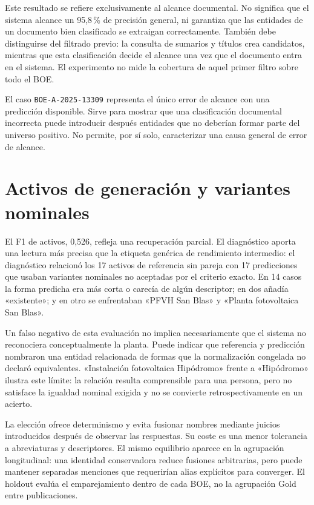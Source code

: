 Este resultado se refiere exclusivamente al alcance documental. No significa
que el sistema alcance un 95,8\,\% de precisión general, ni garantiza que las
entidades de un documento bien clasificado se extraigan correctamente. También
debe distinguirse del filtrado previo: la consulta de sumarios y títulos crea
candidatos, mientras que esta clasificación decide el alcance una vez que el
documento entra en el sistema. El experimento no mide la cobertura de aquel
primer filtro sobre todo el BOE.

El caso \texttt{BOE-A-2025-13309} representa el único error de alcance con una
predicción disponible. Sirve para mostrar que una clasificación documental
incorrecta puede introducir después entidades que no deberían formar parte
del universo positivo. No permite, por sí solo, caracterizar una causa general
de error de alcance.

\section{Activos de generación y variantes nominales}
El F1 de activos, 0,526, refleja una recuperación parcial. El diagnóstico
aporta una lectura más precisa que la etiqueta genérica de rendimiento
intermedio: el diagnóstico relacionó los 17 activos de referencia sin pareja
con 17 predicciones que usaban variantes nominales no aceptadas por el criterio
exacto. En 14 casos la forma predicha era más corta o carecía de algún
descriptor; en dos añadía «existente»; y en otro se enfrentaban «PFVH San
Blas» y «Planta fotovoltaica San Blas».

Un falso negativo de esta evaluación no implica necesariamente que el sistema
no reconociera conceptualmente la planta. Puede indicar que referencia y
predicción nombraron una entidad relacionada de formas que la normalización
congelada no declaró equivalentes. «Instalación fotovoltaica Hipódromo» frente
a «Hipódromo» ilustra este límite: la relación resulta comprensible para una
persona, pero no satisface la igualdad nominal exigida y no se convierte
retrospectivamente en un acierto.

La elección ofrece determinismo y evita fusionar nombres mediante juicios
introducidos después de observar las respuestas. Su coste es una menor
tolerancia a abreviaturas y descriptores. El mismo equilibrio aparece en la
agrupación longitudinal: una identidad conservadora reduce fusiones arbitrarias,
pero puede mantener separadas menciones que requerirían alias explícitos para
converger. El holdout evalúa el emparejamiento dentro de cada BOE, no la
agrupación Gold entre publicaciones.

